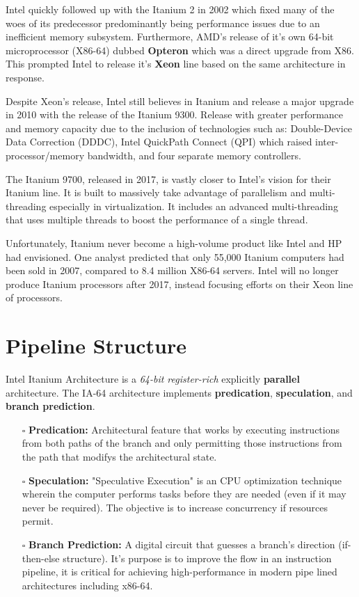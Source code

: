 \documentclass{article}
\begin{document}
Intel quickly followed up with the Itanium 2 in 2002 which fixed many of the woes of its predecessor predominantly being performance issues due to an inefficient memory subsystem. Furthermore, AMD's release of it's own 64-bit microprocessor (X86-64) dubbed \textbf{Opteron} which was a direct upgrade from X86. This prompted Intel to release it's \textbf{Xeon} line based on the same architecture in response.

Despite Xeon's release, Intel still believes in Itanium and release a major upgrade in 2010 with the release of the Itanium 9300. Release with greater performance and memory capacity due to the inclusion of technologies such as: Double-Device Data Correction (DDDC), Intel QuickPath Connect (QPI) which raised inter-processor/memory bandwidth, and four separate memory controllers. 

The Itanium 9700, released in 2017, is vastly closer to Intel's vision for their Itanium line. It is built to massively take advantage of parallelism and multi-threading especially in virtualization. It includes an advanced multi-threading that uses multiple threads to boost the performance of a single thread. 

Unfortunately, Itanium never become a high-volume product like Intel and HP had envisioned. One analyst predicted that only 55,000 Itanium computers had been sold in 2007, compared to 8.4 million X86-64 servers. Intel will no longer produce Itanium processors after 2017, instead focusing efforts on their Xeon line of processors.

\section{Pipeline Structure}
Intel Itanium Architecture is a \textit{64-bit register-rich} explicitly \textbf{parallel} architecture. The IA-64 architecture implements \textbf{predication}, \textbf{speculation}, and \textbf{branch prediction}.

\begin{itemize}
    \item[$\square$] \textbf{Predication:} Architectural feature that works by executing instructions from both paths of the branch and only permitting those instructions from the path that modifys the architectural state.
    \item[$\square$] \textbf{Speculation:} "Speculative Execution" is an CPU optimization technique wherein the computer performs tasks before they are needed (even if it may never be required). The objective is to increase concurrency if resources permit.
    \item[$\square$] \textbf{Branch Prediction:} A digital circuit that guesses a branch's direction (if-then-else structure). It's purpose is to improve the flow in an instruction pipeline, it is critical for achieving high-performance in modern pipe lined architectures including x86-64.
 \end{itemize}   
 
\end{document}
